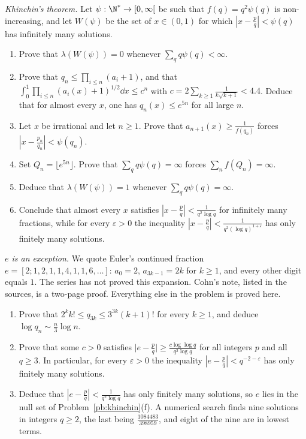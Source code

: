 \begin{exercise}[$\star\star\star$]\label{pb:khinchin}
\emph{Khinchin's theorem.} Let $\psi:\N^*\to[0,\infty[$ be such that $f(q)=q^2\psi(q)$ is non-increasing, and let $W(\psi)$ be the set of $x\in(0,1)$ for which $|x-\frac pq|<\psi(q)$ has infinitely many solutions.
\begin{enumerate}[label=(\alph*)]
\item Prove that $\lambda(W(\psi))=0$ whenever $\sum_qq\psi(q)<\infty$.
\item Prove that $q_n\le\prod_{i\le n}(a_i+1)$, and that $\int_0^1\prod_{i\le n}(a_i(x)+1)^{1/2}\dd x\le c^n$ with $c=2\sum_{k\ge1}\frac1{k\sqrt{k+1}}<4.4$. Deduce that for almost every $x$, one has $q_n(x)\le e^{5n}$ for all large $n$.
\item Let $x$ be irrational and let $n\ge1$. Prove that $a_{n+1}(x)\ge\frac1{f(q_n)}$ forces $|x-\frac{p_n}{q_n}|<\psi(q_n)$.
\item Set $Q_n=\lfloor e^{5n}\rfloor$. Prove that $\sum_qq\psi(q)=\infty$ forces $\sum_nf(Q_n)=\infty$.
\item Deduce that $\lambda(W(\psi))=1$ whenever $\sum_qq\psi(q)=\infty$.
\item Conclude that almost every $x$ satisfies $|x-\frac pq|<\frac1{q^2\log q}$ for infinitely many fractions, while for every $\varepsilon>0$ the inequality $|x-\frac pq|<\frac1{q^2(\log q)^{1+\varepsilon}}$ has only finitely many solutions.
\end{enumerate}
\end{exercise}

\begin{exercise}[$\star\star$]\label{pb:econt}
\emph{$e$ is an exception.} We quote Euler's continued fraction $e=[2;1,2,1,1,4,1,1,6,\dots]$: $a_0=2$, $a_{3k-1}=2k$ for $k\ge1$, and every other digit equals $1$. The series has not proved this expansion. Cohn's note, listed in the sources, is a two-page proof. Everything else in the problem is proved here.
\begin{enumerate}[label=(\alph*)]
\item Prove that $2^kk!\le q_{3k}\le 3^{3k}(k+1)!$ for every $k\ge1$, and deduce $\log q_n\sim\frac n3\log n$.
\item Prove that some $c>0$ satisfies $\bigl|e-\frac pq\bigr|\ge\frac{c\log\log q}{q^2\log q}$ for all integers $p$ and all $q\ge3$. In particular, for every $\varepsilon>0$ the inequality $|e-\frac pq|<q^{-2-\varepsilon}$ has only finitely many solutions.
\item Deduce that $|e-\frac pq|<\frac1{q^2\log q}$ has only finitely many solutions, so $e$ lies in the null set of Problem~\ref{pb:khinchin}(f). A numerical search finds nine solutions in integers $q\ge2$, the last being $\frac{1084483}{398959}$, and eight of the nine are in lowest terms.
\end{enumerate}
\end{exercise}


